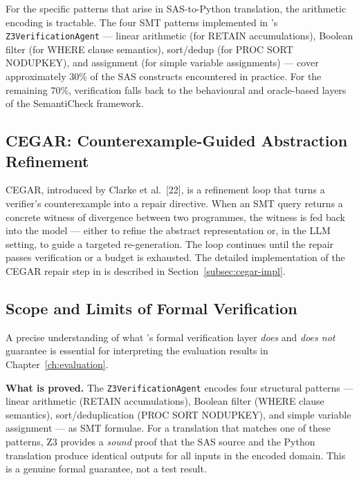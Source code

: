 For the specific patterns that arise in SAS-to-Python translation, the
arithmetic encoding is tractable. The four \ac{SMT} patterns implemented in
\codara{}'s \texttt{Z3VerificationAgent} --- linear arithmetic (for RETAIN
accumulations), Boolean filter (for WHERE clause semantics), sort/dedup (for
PROC SORT NODUPKEY), and assignment (for simple variable assignments) --- cover
approximately 30\% of the SAS constructs encountered in practice. For the
remaining 70\%, verification falls back to the behavioural and oracle-based
layers of the SemantiCheck framework.

\subsection{CEGAR: Counterexample-Guided Abstraction Refinement}
\label{subsec:cegar-theory}

\ac{CEGAR}, introduced by Clarke et al.~[22], is a refinement loop that turns
a verifier's counterexample into a repair directive. When an \ac{SMT} query
returns a concrete witness of divergence between two programmes, the witness is
fed back into the model --- either to refine the abstract representation or, in
the \ac{LLM} setting, to guide a targeted re-generation. The loop continues
until the repair passes verification or a budget is exhausted. The detailed
implementation of the \ac{CEGAR} repair step in \codara{} is described in
Section~\ref{subsec:cegar-impl}.

\subsection{Scope and Limits of Formal Verification}
\label{subsec:fv-scope}

A precise understanding of what \codara{}'s formal verification layer
\emph{does} and \emph{does not} guarantee is essential for interpreting the
evaluation results in Chapter~\ref{ch:evaluation}.

\textbf{What is proved.} The \texttt{Z3VerificationAgent} encodes four
structural patterns --- linear arithmetic (RETAIN accumulations), Boolean
filter (WHERE clause semantics), sort/deduplication (PROC SORT NODUPKEY), and
simple variable assignment --- as \ac{SMT} formulae. For a translation that
matches one of these patterns, Z3 provides a \emph{sound} proof that the SAS
source and the Python translation produce identical outputs for all inputs in
the encoded domain. This is a genuine formal guarantee, not a test result.

